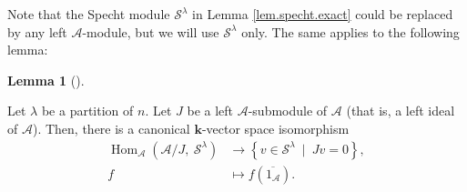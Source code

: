 \documentclass[numbers=enddot,12pt,final,onecolumn,notitlepage]{scrartcl}%
\theoremstyle{definition}
\newtheorem{lem}[theo]{Lemma}
\newenvironment{lemma}[1][]
{\begin{lem}[#1]\begin{leftbar}}
{\end{leftbar}\end{lem}}
\begin{document}
Note that the Specht module $\mathcal{S}^{\lambda}$ in Lemma
\ref{lem.specht.exact} could be replaced by any left $\mathcal{A}$-module, but
we will use $\mathcal{S}^{\lambda}$ only. The same applies to the following lemma:

\begin{lemma}
\label{lem.specht.f1A}Let $\lambda$ be a partition of $n$. Let $J$ be a left
$\mathcal{A}$-submodule of $\mathcal{A}$ (that is, a left ideal of
$\mathcal{A}$). Then, there is a canonical $\mathbf{k}$-vector space
isomorphism%
\begin{align*}
\operatorname*{Hom}\nolimits_{\mathcal{A}}\left(  \mathcal{A}/J,\ \mathcal{S}%
^{\lambda}\right)   &  \rightarrow\left\{  v\in\mathcal{S}^{\lambda}%
\ \mid\ Jv=0\right\}  ,\\
f  &  \mapsto f\left(  \overline{1_{\mathcal{A}}}\right)  .
\end{align*}

\end{lemma}
\end{document}
